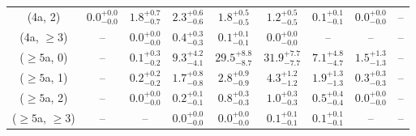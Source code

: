 \begin{table}[h!]
{\begin{tabular}{ccccccccc}
	(4a, 2) & $0.0^{+ 0.0 }_{- 0.0 }$ & $1.8^{+ 0.7 }_{- 0.7 }$ & $2.3^{+ 0.6 }_{- 0.6 }$ & $1.8^{+ 0.5 }_{- 0.5 }$ & $1.2^{+ 0.5 }_{- 0.5 }$ & $0.1^{+ 0.1 }_{- 0.1 }$ & $0.0^{+ 0.0 }_{- 0.0 }$ & -- \\[0.5ex] 
	(4a, $\ge3$) & -- & $0.0^{+ 0.0 }_{- 0.0 }$ & $0.4^{+ 0.3 }_{- 0.3 }$ & $0.1^{+ 0.1 }_{- 0.1 }$ & $0.0^{+ 0.0 }_{- 0.0 }$ & -- & -- & -- \\[0.5ex] 
	($\ge5$a, 0) & -- & $0.1^{+ 0.3 }_{- 0.2 }$ & $9.3^{+ 4.2 }_{- 4.1 }$ & $29.5^{+ 8.8 }_{- 8.7 }$ & $31.9^{+ 7.7 }_{- 7.7 }$ & $7.1^{+ 4.8 }_{- 4.7 }$ & $1.5^{+ 1.3 }_{- 1.3 }$ & -- \\[0.5ex] 
	($\ge5$a, 1) & -- & $0.2^{+ 0.2 }_{- 0.2 }$ & $1.7^{+ 0.8 }_{- 0.8 }$ & $2.8^{+ 0.9 }_{- 0.9 }$ & $4.3^{+ 1.2 }_{- 1.2 }$ & $1.9^{+ 1.3 }_{- 1.3 }$ & $0.3^{+ 0.3 }_{- 0.3 }$ & -- \\[0.5ex] 
	($\ge5$a, 2) & -- & $0.0^{+ 0.0 }_{- 0.0 }$ & $0.2^{+ 0.1 }_{- 0.1 }$ & $0.8^{+ 0.3 }_{- 0.3 }$ & $1.0^{+ 0.3 }_{- 0.3 }$ & $0.5^{+ 0.4 }_{- 0.4 }$ & $0.0^{+ 0.0 }_{- 0.0 }$ & -- \\[0.5ex] 
	($\ge5$a, $\ge3$) & -- & -- & $0.0^{+ 0.0 }_{- 0.0 }$ & $0.0^{+ 0.0 }_{- 0.0 }$ & $0.1^{+ 0.1 }_{- 0.1 }$ & $0.1^{+ 0.1 }_{- 0.1 }$ & -- & -- \\[0.5ex] 
	\hline
	\hline
\end{tabular}}
\end{table}
